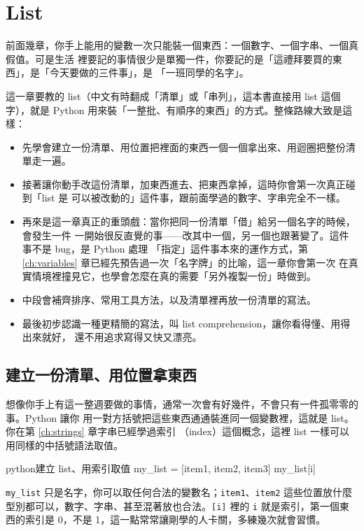 \chapter{List}
\label{ch:lists}

前面幾章，你手上能用的變數一次只能裝一個東西：一個數字、一個字串、一個真假值。可是生活
裡要記的事情很少是單獨一件，你要記的是「這禮拜要買的東西」，是「今天要做的三件事」，是
「一班同學的名字」。

這一章要教的 list（中文有時翻成「清單」或「串列」，這本書直接用
list 這個字），就是 Python 用來裝「一整批、有順序的東西」的方式。整條路線大致是這樣：

\begin{itemize}
\item 先學會建立一份清單、用位置把裡面的東西一個一個拿出來、用迴圈把整份清單走一遍。
\item 接著讓你動手改這份清單，加東西進去、把東西拿掉，這時你會第一次真正碰到「list 是
可以被改動的」這件事，跟前面學過的數字、字串完全不一樣。
\item 再來是這一章真正的重頭戲：當你把同一份清單「借」給另一個名字的時候，會發生一件
一開始很反直覺的事——改其中一個，另一個也跟著變了。這件事不是 bug，是 Python 處理
「指定」這件事本來的運作方式，第 \ref{ch:variables} 章已經先預告過一次「名字牌」的比喻，這一章你會第一次
在真實情境裡撞見它，也學會怎麼在真的需要「另外複製一份」時做到。
\item 中段會補齊排序、常用工具方法，以及清單裡再放一份清單的寫法。
\item 最後初步認識一種更精簡的寫法，叫 list comprehension，讓你看得懂、用得出來就好，
還不用追求寫得又快又漂亮。
\end{itemize}

\section{建立一份清單、用位置拿東西}
\label{sec:list-basics}

想像你手上有這一整週要做的事情，通常一次會有好幾件，不會只有一件孤零零的事。Python 讓你
用一對方括號把這些東西通通裝進同一個變數裡，這就是 list。你在第 \ref{ch:strings} 章字串已經學過索引
（index）這個概念，這裡 list 一樣可以用同樣的中括號語法取值。

\begin{code}{python}{建立 list、用索引取值}
my_list = [item1, item2, item3]
my_list[i]
\end{code}

\texttt{my\_list} 只是名字，你可以取任何合法的變數名；\texttt{item1}、\texttt{item2}
這些位置放什麼型別都可以，數字、字串、甚至混著放也合法。\texttt{[i]} 裡的 \texttt{i}
就是索引，第一個東西的索引是 0，不是 1，這一點常常讓剛學的人卡關，多練幾次就會習慣。

